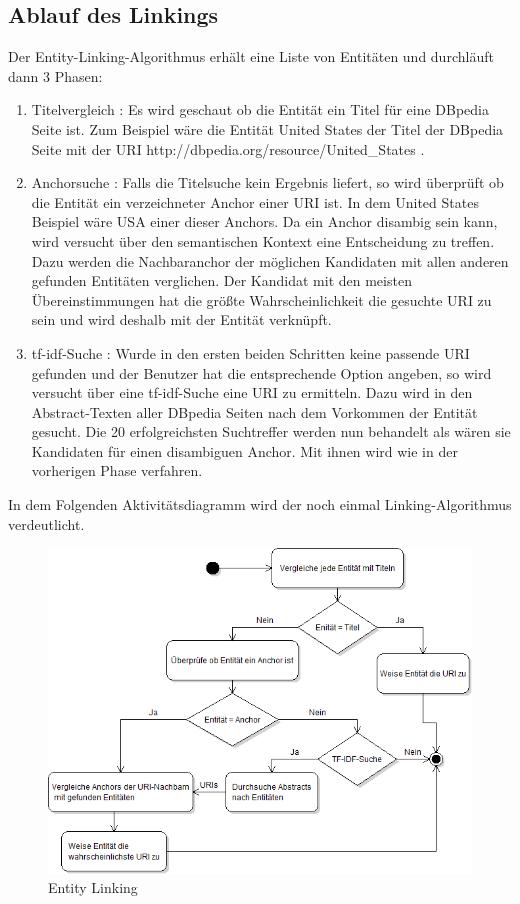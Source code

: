 \documentclass[11pt, a4paper, oneside]{Thesis} %
\begin{document}
\subsection{Ablauf des Linkings}
Der Entity-Linking-Algorithmus erh\"alt eine Liste von Entit\"aten und durchl\"auft dann 3 Phasen:
\begin{enumerate}
\item Titelvergleich : Es wird geschaut ob die Entit\"at ein Titel f\"ur eine DBpedia Seite ist. Zum Beispiel w\"are die Entit\"at \glqq United States\grqq{} der Titel der DBpedia Seite mit der URI \glqq http://dbpedia.org/resource/United\_States\grqq{} .

\item Anchorsuche : Falls die Titelsuche kein Ergebnis liefert, so wird \"uberpr\"uft ob die Entit\"at ein verzeichneter Anchor einer URI ist. In dem United States Beispiel w\"are \glqq USA\grqq{} einer dieser Anchors. Da ein Anchor disambig sein kann, wird versucht \"uber den semantischen Kontext eine Entscheidung zu treffen. Dazu werden die Nachbaranchor der möglichen Kandidaten mit allen anderen gefunden Entit\"aten verglichen. Der Kandidat mit den meisten \"Ubereinstimmungen hat die grö\ss te Wahrscheinlichkeit die gesuchte URI zu sein und wird deshalb mit der Entit\"at verkn\"upft.

\item tf-idf-Suche : Wurde in den ersten beiden Schritten keine passende URI gefunden und der Benutzer hat die entsprechende Option angeben, so wird versucht \"uber eine tf-idf-Suche eine URI zu ermitteln. Dazu wird in den Abstract-Texten aller DBpedia Seiten nach dem Vorkommen der Entit\"at gesucht. Die 20 erfolgreichsten Suchtreffer werden nun behandelt als w\"aren sie Kandidaten f\"ur einen disambiguen Anchor. Mit ihnen wird wie in der vorherigen Phase verfahren.
\end{enumerate}
In dem Folgenden Aktivit\"atsdiagramm wird der noch einmal Linking-Algorithmus verdeutlicht.
\begin{figure}[ht!]
\centering
\includegraphics[scale=0.55]{./ablauf.png}
\caption[Entity Linking]{Entity Linking}
\end{figure}
\end{document}
